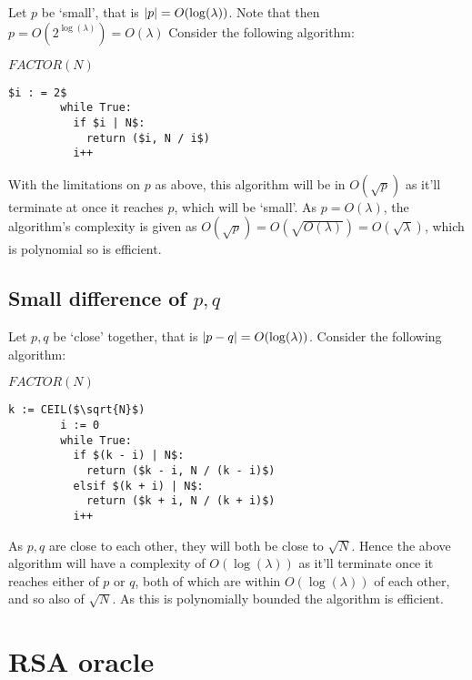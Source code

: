 \documentclass[a4paper]{scrreprt}
\DeclarePairedDelimiter\abs{\lvert}{\rvert}
\begin{document}
Let $p$ be `small', that is $\abs{p} = O(\log(\lambda))$. Note that then $p =
O(2^{\log(\lambda)}) = O(\lambda)$ Consider the following algorithm:

\begin{library}{$FACTOR(N)$}
	\begin{lstlisting}[mathescape=true,autogobble=true]
		$i : = 2$
		while True:
		  if $i | N$:
		    return ($i, N / i$)
		  i++
	\end{lstlisting}
\end{library}

With the limitations on $p$ as above, this algorithm will be in $O(\sqrt{p})$
as it'll terminate at once it reaches $p$, which will be `small'. As $p =
O(\lambda)$, the algorithm's complexity is given as $O(\sqrt{p}) =
O(\sqrt{O(\lambda)}) = O(\sqrt{\lambda})$, which is polynomial so is efficient.

\subsection{Small difference of $p, q$}

Let $p, q$ be `close' together, that is $\abs{p - q} = O(\log(\lambda))$.
Consider the following algorithm:

\begin{library}{$FACTOR(N)$}
	\begin{lstlisting}[mathescape=true,autogobble=true]
		k := CEIL($\sqrt{N}$)
		i := 0
		while True:
		  if $(k - i) | N$:
		    return ($k - i, N / (k - i)$)
		  elsif $(k + i) | N$:
		    return ($k + i, N / (k + i)$)
		  i++
	\end{lstlisting}
\end{library}

As $p, q$ are close to each other, they will both be close to $\sqrt{N}$. Hence
the above algorithm will have a complexity of $O(\log(\lambda))$ as it'll
terminate once it reaches either of $p$ or $q$, both of which are within
$O(\log(\lambda))$ of each other, and so also of $\sqrt{N}$. As this is
polynomially bounded the algorithm is efficient.

\section{RSA oracle}
\end{document}
